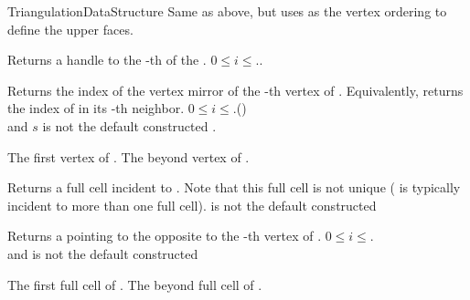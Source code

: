 \begin{ccRefConcept}{TriangulationDataStructure}
\ccGlue{} {Same as above, but uses  as
 the vertex ordering to define the upper faces.}


{ Returns a handle to the -th  of the  .
\ccPrecond $0\leq i\leq$\ccVar..}

{Returns the index of the vertex mirror of the -th vertex of .
Equivalently, returns the index of  in its -th neighbor.
\ccPrecond $0\leq i\leq$\ccVar.()\\
and $s$ is not the default constructed . }

{}
{
The first vertex of \ccVar.
}
\ccGlue
{}
{
The beyond vertex of \ccVar.
}


{Returns a full cell incident to  . Note that this
  full cell is
not unique ( is typically incident to more than one full cell).
\ccPrecond{} is not the default constructed }

{ Returns a  pointing to the 
opposite to the -th vertex of . 
\ccPrecond$0\leq i \leq$\ccVar.\\
and  is not the default constructed }

{
The first full cell of \ccVar.
}
\ccGlue
{}
{
The beyond full cell of \ccVar.
}



\end{ccRefConcept}
